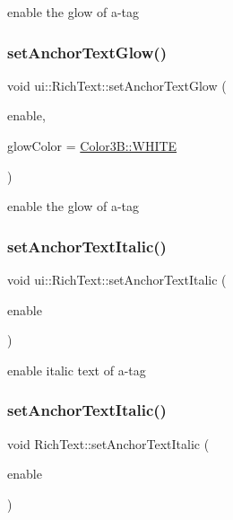 enable the glow of a-\/tag \mbox{\label{classui_1_1RichText_a71a3a6d9c9bb3c62b36b5b989b7a3c55}} 
\subsubsection{\texorpdfstring{set\+Anchor\+Text\+Glow()}{setAnchorTextGlow()}\hspace{0.1cm}{\footnotesize\ttfamily [2/2]}}
{\footnotesize\ttfamily void ui\+::\+Rich\+Text\+::set\+Anchor\+Text\+Glow (\begin{DoxyParamCaption}\item[{bool}]{enable,  }\item[{const \hyperlink{structColor3B}{Color3B} \&}]{glow\+Color = {\ttfamily \hyperlink{structColor3B_adf57cb86ca15f434b29215ad471cdc35}{Color3\+B\+::\+W\+H\+I\+TE}} }\end{DoxyParamCaption})}

enable the glow of a-\/tag \mbox{\label{classui_1_1RichText_a0b7b72f39b363b3ab4bf99d623464123}} 
\subsubsection{\texorpdfstring{set\+Anchor\+Text\+Italic()}{setAnchorTextItalic()}\hspace{0.1cm}{\footnotesize\ttfamily [1/2]}}
{\footnotesize\ttfamily void ui\+::\+Rich\+Text\+::set\+Anchor\+Text\+Italic (\begin{DoxyParamCaption}\item[{bool}]{enable }\end{DoxyParamCaption})}

enable italic text of a-\/tag \mbox{\label{classui_1_1RichText_ac453dba85e6b3ae984505377244e8cab}} 
\subsubsection{\texorpdfstring{set\+Anchor\+Text\+Italic()}{setAnchorTextItalic()}\hspace{0.1cm}{\footnotesize\ttfamily [2/2]}}
{\footnotesize\ttfamily void Rich\+Text\+::set\+Anchor\+Text\+Italic (\begin{DoxyParamCaption}\item[{bool}]{enable }\end{DoxyParamCaption})}

